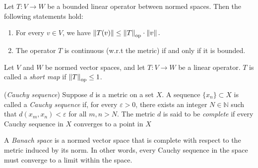 \begin{lemma} \cite[Lemma 6.4]{InfiniteDimensionalAnalysis2006} \label{lemma:op_norm_submult} %
Let \( T: V \rightarrow W \) be a bounded linear operator between normed spaces. Then the following statements hold:
\begin{enumerate}
  \item For every \( v \in V \), we have \( 
  \left\lVert T(v) \right\rVert \leq \left\lVert T \right\rVert_{\text{op}} \cdot \left\lVert v \right\rVert.\)
  \item The operator \( T \) is continuous (w.r.t the metric) if and only if it is bounded.
\end{enumerate}
\end{lemma}




\begin{definition}
  Let \( V \) and \( W \) be normed vector spaces, and let \( T: V \rightarrow W \) be a linear operator. $T$ is called a \emph{short map} if $\left\lVert T \right\rVert_{\text{op}} \leq 1$.
\end{definition}





\begin{definition} (\emph{Cauchy sequence})
  Suppose $ d $ is a metric on a set $ X $. A sequence $ \{x_n\} \subset X $ is called a \emph{Cauchy sequence} if, for every $ \varepsilon > 0 $, there exists an integer $N \in \mathbb{N} $ such that $ d(x_m, x_n) < \varepsilon $ for all $ m, n > N $.  The metric \( d \) is said to be \emph{complete} if every Cauchy sequence in \( X \) converges to a point in \( X \)
\end{definition}

\begin{definition}
  A \emph{Banach space} is a normed vector space that is complete with respect to the metric induced by its norm. In other words, every Cauchy sequence in the space must converge to a limit within the space.
\end{definition}
 




